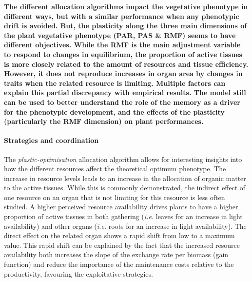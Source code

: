 \textbf{The different allocation algorithms impact the vegetative phenotype in different ways, but with a similar performance when any phenotypic drift is avoided. But, the plasticity along the three main dimensions of the plant vegetative phenotype (PAR, PAS \& RMF) seems to have different objectives. While the RMF is the main adjustment variable to respond to changes in equilibrium, the proportion of active tissues is more closely related to the amount of resources and tissue efficiency.  However, it does not reproduce increases in organ area by changes in traits when the related resource is limiting. Multiple factors can explain this partial discrepancy with empirical results. The model still can be used to better understand the role of the memory as a driver for the phenotypic development, and the effects of the plasticity (particularly the RMF dimension) on plant performances.}

\paragraph{Strategies and coordination}

The \textit{plastic-optimisation} allocation algorithm allows for interesting insights into how the different resources affect the theoretical optimum phenotype. The increase in resource levels leads to an increase in the allocation of organic matter to the active tissues. While this is commonly demonstrated, the indirect effect of one resource on an organ that is not limiting for this resource is less often studied. A higher perceived resource availability drives plants to have a higher proportion of active tissues in both gathering (\textit{i.e.} leaves for an increase in light availability) and other organs (\textit{i.e.} roots for an increase in light availability). The direct effect on the related organ shows a rapid shift from low to a maximum value. This rapid shift can be explained by the fact that the increased resource availability both increases the slope of the exchange rate per biomass (gain function) and reduce the importance of the maintenance costs relative to the productivity, favouring the exploitative strategies.

